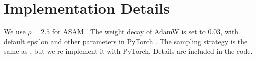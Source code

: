 \documentclass[10pt,twocolumn,letterpaper]{article}
\begin{document}
\section{Implementation Details}
\label{sec:detail}
We use $\rho=2.5$ for ASAM \cite{ASAM}. The weight decay of AdamW is set to $0.03$, with default epsilon and other parameters in PyTorch \cite{paszke2019pytorch}. The sampling strategy is the same as \cite{zhu2021vigor}, but we re-implement it with PyTorch. Details are included in the code.
\end{document}
